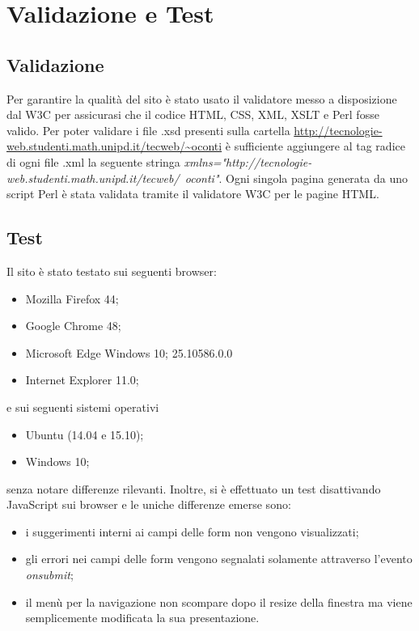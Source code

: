 \documentclass[../Relazione.tex]{subfiles}
\begin{document}
\section{Validazione e Test}

\subsection{Validazione}

Per garantire la qualità del sito è stato usato il validatore messo a disposizione dal W3C per assicurasi che il codice HTML, CSS, XML, XSLT e Perl fosse valido.
Per poter validare i file .xsd presenti sulla cartella \url{http://tecnologie-web.studenti.math.unipd.it/tecweb/~oconti} è sufficiente aggiungere al tag radice di ogni file .xml la seguente stringa \textit{xmlns="http://tecnologie-web.studenti.math.unipd.it/tecweb/~oconti"}. Ogni singola pagina generata da uno script Perl è stata validata tramite il validatore W3C per le pagine HTML.

\subsection{Test}

Il sito è stato testato sui seguenti browser:
\begin{itemize}
\item Mozilla Firefox 44;
\item Google Chrome 48;
\item Microsoft Edge Windows 10;
25.10586.0.0
\item Internet Explorer 11.0;
\end{itemize}

e sui seguenti sistemi operativi

\begin{itemize}
\item Ubuntu (14.04 e 15.10);
\item Windows 10;
\end{itemize}

senza notare differenze rilevanti. Inoltre, si è effettuato un test disattivando JavaScript sui browser e le uniche differenze emerse sono:

\begin{itemize}
\item i suggerimenti interni ai campi delle form non vengono visualizzati;
\item gli errori nei campi delle form vengono segnalati solamente attraverso l'evento \textit{onsubmit};
\item il menù per la navigazione non scompare dopo il resize della finestra ma viene semplicemente modificata la sua presentazione.
\end{itemize}
			
\end{document}
